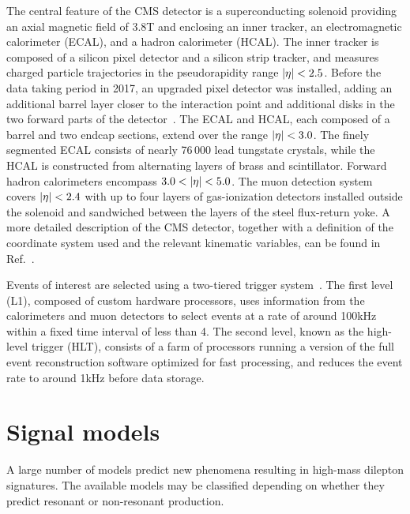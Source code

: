 \documentclass[11pt,twoside,a4paper,cmspaper,final,collab]{cms-tdr}
\begin{document}
The central feature of the CMS detector is a superconducting solenoid providing an axial magnetic field of 3.8\unit{T} and enclosing an inner tracker, an electromagnetic calorimeter (ECAL), and a hadron calorimeter (HCAL).
The inner tracker is composed of a silicon pixel detector and a silicon strip tracker, and measures charged particle trajectories in the pseudorapidity range $\lvert \eta \rvert<2.5$. Before the data taking period in 2017, an upgraded pixel detector was installed, adding an additional  barrel layer closer to the interaction point and additional disks in the two forward parts of the detector~\cite{Dominguez:1481838}.
The ECAL and HCAL, each composed of a barrel and two endcap sections, extend over the range $\lvert \eta \rvert < 3.0$.
The finely segmented ECAL consists of nearly 76\,000 lead tungstate crystals, while the HCAL is constructed from alternating layers of brass and scintillator.
Forward hadron calorimeters encompass $3.0<\lvert \eta \rvert<5.0$.
The muon detection system covers $\lvert \eta \rvert<2.4$ with up to four layers of gas-ionization detectors installed outside the solenoid and sandwiched between the layers of the steel flux-return yoke.
A more detailed description of the CMS detector, together with a definition of the coordinate system used and the relevant kinematic variables, can be found in Ref.~\cite{Chatrchyan:2008zzk}.

Events of interest are selected using a two-tiered trigger system~\cite{Khachatryan:2016bia}. The first level (L1), composed of custom hardware processors, uses information from the calorimeters and muon detectors to select events at a rate of around 100\unit{kHz} within a fixed time interval of less than 4\mus. The second level, known as the high-level trigger (HLT), consists of a farm of processors running a version of the full event reconstruction software optimized for fast processing, and reduces the event rate to around 1\unit{kHz} before data storage. 

\section{Signal models}
\label{sec:models}
A large number of models predict new phenomena resulting in high-mass dilepton signatures. The available models may be classified depending on whether they predict resonant or non-resonant production.
\end{document}
